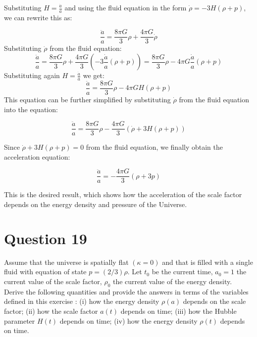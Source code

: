 \documentclass{article}
\begin{document}
Substituting $H = \frac{\dot{a}}{a}$ and using the fluid equation in the form $\dot{\rho} = -3H(\rho + p)$, we can rewrite this as:

\begin{equation}
\frac{\ddot{a}}{a} = \frac{8\pi G}{3}\rho + \frac{4\pi G}{3} \dot{\rho}
\end{equation}
Substituting $\dot{\rho}$ from the fluid equation:
\begin{equation}
\frac{\ddot{a}}{a} = \frac{8\pi G}{3}\rho + \frac{4\pi G}{3} \left( -3\frac{\dot{a}}{a}(\rho + p) \right) = \frac{8\pi G}{3}\rho - 4\pi G \frac{\dot{a}}{a}(\rho + p)
\end{equation}
Substituting again $H = \frac{\dot{a}}{a}$ we get:
\begin{equation}
\frac{\ddot{a}}{a} = \frac{8\pi G}{3}\rho - 4\pi G H(\rho + p)
\end{equation}
This equation can be further simplified by substituting $\dot{\rho}$ from the fluid equation into the equation:

\begin{equation}
\frac{\ddot{a}}{a} = \frac{8 \pi G}{3} \rho - \frac{4 \pi G}{3} ( \dot{\rho} + 3H(\rho + p) )
\end{equation}

Since $\dot{\rho} + 3H(\rho + p) = 0$ from the fluid equation, we finally obtain the acceleration equation:

\begin{equation}
\frac{\ddot{a}}{a} = -\frac{4 \pi G}{3} (\rho + 3p)
\end{equation}

This is the desired result, which shows how the acceleration of the scale factor depends on the energy density and pressure of the Universe.

\pagebreak

\section*{Question 19}
Assume that the universe is spatially flat $(\kappa=0)$ and that is filled with a single fluid with equation of state $p=(2 / 3) \rho$. Let $t_{0}$ be the current time, $a_{0}=1$ the current value of the scale factor, $\rho_{0}$ the current value of the energy density. Derive the following quantities and provide the answers in terms of the variables defined in this exercise : (i) how the energy density $\rho(a)$ depends on the scale factor; (ii) how the scale factor $a(t)$ depends on time; (iii) how the Hubble parameter $H(t)$ depends on time; (iv) how the energy density $\rho(t)$ depends on time.
\end{document}
